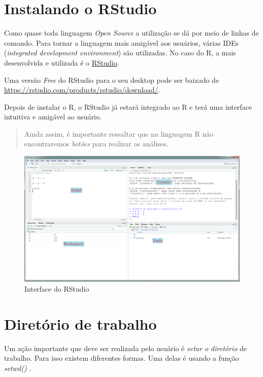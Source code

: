 \documentclass[
]{book}
\begin{document}
\hypertarget{instalando-o-rstudio}{%
\section{Instalando o RStudio}\label{instalando-o-rstudio}}

Como quase toda linguagem \emph{Open Source} a utilização se dá por meio de linhas de comando. Para tornar a linguagem mais amigável aos usuários, várias IDEs (\emph{integrated development environment}) são utilizadas. No caso do R, a mais desenvolvida e utilizada é o \href{https://rstudio.com/products/rstudio/}{RStudio}.

Uma versão \emph{Free} do RStudio para o seu desktop pode ser baixado de \url{https://rstudio.com/products/rstudio/download/}.

Depois de instalar o R, o RStudio já estará integrado ao R e terá uma interface intuitiva e amigável ao usuário.

\begin{quote}
Ainda assim, é importante ressaltar que na linguagem R não encontraremos \emph{botões} para realizar as análises.
\end{quote}

\begin{figure}
\includegraphics[width=0.9\linewidth]{Figuras/RStudio} \caption{Interface do RStudio}\label{fig:rstudio}
\end{figure}

\hypertarget{diretuxf3rio-de-trabalho}{%
\section{Diretório de trabalho}\label{diretuxf3rio-de-trabalho}}

Um ação importante que deve ser realizada pelo usuário é \emph{setar o diretório} de trabalho. Para isso existem diferentes formas. Uma delas é usando a função \emph{setwd()} .
\end{document}

